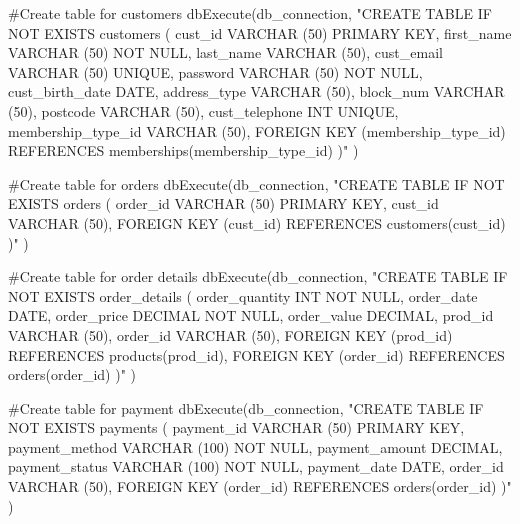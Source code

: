 \documentclass[
  letterpaper,
  DIV=11,
  numbers=noendperiod]{scrartcl}
\newenvironment{Shaded}{\begin{snugshade}}{\end{snugshade}}
\newcommand{\CommentTok}[1]{\textcolor[rgb]{0.37,0.37,0.37}{#1}}
\newcommand{\FunctionTok}[1]{\textcolor[rgb]{0.28,0.35,0.67}{#1}}
\newcommand{\NormalTok}[1]{\textcolor[rgb]{0.00,0.23,0.31}{#1}}
\newcommand{\StringTok}[1]{\textcolor[rgb]{0.13,0.47,0.30}{#1}}
\begin{document}
\begin{Shaded}
\begin{Highlighting}[numbers=left,,]
\CommentTok{\#Create table for customers}
\FunctionTok{dbExecute}\NormalTok{(db\_connection, }
          \StringTok{"CREATE TABLE IF NOT EXISTS customers (}
\StringTok{              cust\_id VARCHAR (50) PRIMARY KEY,}
\StringTok{              first\_name VARCHAR (50) NOT NULL,}
\StringTok{              last\_name VARCHAR (50),}
\StringTok{              cust\_email VARCHAR (50) UNIQUE,}
\StringTok{              password VARCHAR (50) NOT NULL,}
\StringTok{              cust\_birth\_date DATE,}
\StringTok{              address\_type VARCHAR (50),}
\StringTok{              block\_num VARCHAR (50),}
\StringTok{              postcode VARCHAR (50),}
\StringTok{              cust\_telephone INT UNIQUE,}
\StringTok{              membership\_type\_id VARCHAR (50),}
\StringTok{              FOREIGN KEY (membership\_type\_id)}
\StringTok{                REFERENCES memberships(membership\_type\_id)}
\StringTok{              )"}
\NormalTok{          )}

\CommentTok{\#Create table for orders}
\FunctionTok{dbExecute}\NormalTok{(db\_connection, }
          \StringTok{"CREATE TABLE IF NOT EXISTS orders (}
\StringTok{              order\_id VARCHAR (50) PRIMARY KEY,}
\StringTok{              cust\_id VARCHAR (50),}
\StringTok{              FOREIGN KEY (cust\_id)}
\StringTok{                REFERENCES customers(cust\_id)}
\StringTok{              )"}
\NormalTok{          )}

\CommentTok{\#Create table for order details}
\FunctionTok{dbExecute}\NormalTok{(db\_connection, }
          \StringTok{"CREATE TABLE IF NOT EXISTS order\_details (}
\StringTok{              order\_quantity INT NOT NULL,}
\StringTok{              order\_date DATE,}
\StringTok{              order\_price DECIMAL NOT NULL,}
\StringTok{              order\_value DECIMAL,}
\StringTok{              prod\_id VARCHAR (50),}
\StringTok{              order\_id VARCHAR (50),}
\StringTok{              FOREIGN KEY (prod\_id)}
\StringTok{                REFERENCES products(prod\_id),}
\StringTok{              FOREIGN KEY (order\_id)}
\StringTok{                REFERENCES orders(order\_id)}
\StringTok{              )"}
\NormalTok{          )}

\CommentTok{\#Create table for payment}
\FunctionTok{dbExecute}\NormalTok{(db\_connection, }
          \StringTok{"CREATE TABLE IF NOT EXISTS payments (}
\StringTok{              payment\_id VARCHAR (50) PRIMARY KEY,}
\StringTok{              payment\_method VARCHAR (100) NOT NULL,}
\StringTok{              payment\_amount DECIMAL,}
\StringTok{              payment\_status VARCHAR (100) NOT NULL,}
\StringTok{              payment\_date DATE,}
\StringTok{              order\_id VARCHAR (50),}
\StringTok{              FOREIGN KEY (order\_id)}
\StringTok{                REFERENCES orders(order\_id)}
\StringTok{              )"}
\NormalTok{          )}


\end{Highlighting}
\end{Shaded}
\end{document}
